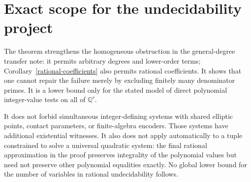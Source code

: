 \documentclass[11pt]{article}
\newcommand{\Q}{\mathbb Q}\newcommand{\Z}{\mathbb Z}
\begin{document}
\section*{Exact scope for the undecidability project}
The theorem strengthens the homogeneous obstruction in the general-degree
transfer note: it permits arbitrary degrees and lower-order terms;
Corollary~\ref{rational-coefficients} also permits rational coefficients.
It
shows that one cannot repair the failure merely by excluding finitely
many denominator primes. It is a lower bound only for the stated model
of direct polynomial integer-value tests on all of $\Q^r$.

It does not forbid simultaneous integer-defining systems with shared
elliptic points, contact parameters, or finite-algebra encoders. Those
systems have additional existential witnesses. It also does not apply
automatically to a tuple constrained to solve a universal quadratic
system: the final rational approximation in the proof preserves
integrality of the polynomial values but need not preserve other
polynomial equalities exactly. No global lower bound for the number of
variables in rational undecidability follows.
\end{document}
